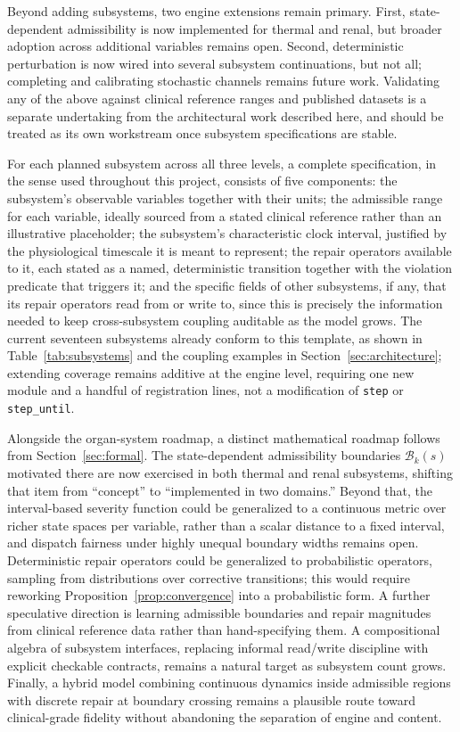\documentclass[11pt]{article}
\begin{document}
Beyond adding subsystems, two engine extensions remain primary. First, state-dependent admissibility is now implemented for thermal and renal, but broader adoption across additional variables remains open. Second, deterministic perturbation is now wired into several subsystem continuations, but not all; completing and calibrating stochastic channels remains future work. Validating any of the above against clinical reference ranges and published datasets is a separate undertaking from the architectural work described here, and should be treated as its own workstream once subsystem specifications are stable.

For each planned subsystem across all three levels, a complete specification, in the sense used throughout this project, consists of five components: the subsystem's observable variables together with their units; the admissible range for each variable, ideally sourced from a stated clinical reference rather than an illustrative placeholder; the subsystem's characteristic clock interval, justified by the physiological timescale it is meant to represent; the repair operators available to it, each stated as a named, deterministic transition together with the violation predicate that triggers it; and the specific fields of other subsystems, if any, that its repair operators read from or write to, since this is precisely the information needed to keep cross-subsystem coupling auditable as the model grows. The current seventeen subsystems already conform to this template, as shown in Table~\ref{tab:subsystems} and the coupling examples in Section~\ref{sec:architecture}; extending coverage remains additive at the engine level, requiring one new module and a handful of registration lines, not a modification of \texttt{step} or \texttt{step\_until}.

Alongside the organ-system roadmap, a distinct mathematical roadmap follows from Section~\ref{sec:formal}. The state-dependent admissibility boundaries $\mathcal B_k(s)$ motivated there are now exercised in both thermal and renal subsystems, shifting that item from ``concept'' to ``implemented in two domains.'' Beyond that, the interval-based severity function could be generalized to a continuous metric over richer state spaces per variable, rather than a scalar distance to a fixed interval, and dispatch fairness under highly unequal boundary widths remains open. Deterministic repair operators could be generalized to probabilistic operators, sampling from distributions over corrective transitions; this would require reworking Proposition~\ref{prop:convergence} into a probabilistic form. A further speculative direction is learning admissible boundaries and repair magnitudes from clinical reference data rather than hand-specifying them. A compositional algebra of subsystem interfaces, replacing informal read/write discipline with explicit checkable contracts, remains a natural target as subsystem count grows. Finally, a hybrid model combining continuous dynamics inside admissible regions with discrete repair at boundary crossing remains a plausible route toward clinical-grade fidelity without abandoning the separation of engine and content.
\end{document}
